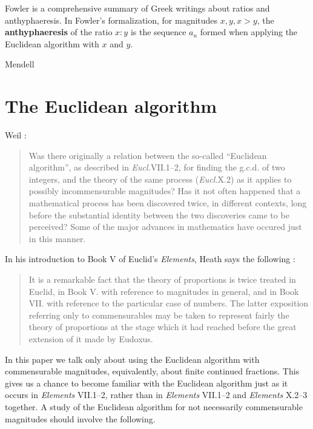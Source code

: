 \documentclass{article}
\begin{document}
Fowler \cite{fowler} is a comprehensive summary of Greek writings about ratios and anthyphaeresis. In Fowler's
formalization, for
magnitudes $x,y, x>y$, the \textbf{anthyphaeresis}
of the ratio $x:y$ is 
the sequence $a_n$ formed when applying the Euclidean algorithm with $x$ and $y$. 
 


Mendell \cite{mendell}





\section{The Euclidean algorithm}
Weil \cite[p.~5, Chap. I, \S II]{weil}:

\begin{quote}
Was there originally a relation between the so-called ``Euclidean algorithm'', as described in {\em Eucl.}VII.1--2, for finding
the g.c.d. of two integers, and the theory of the same process ({\em Eucl.}X.2) as it applies to
possibly incommensurable magnitudes? Has it not often happened that a mathematical process has been discovered twice,
in different contexts, long before the substantial identity between the two discoveries came to be perceived?
Some of the major advances in mathematics have occured just in this manner.
\end{quote}

In his introduction to Book V of Euclid's {\em Elements}, Heath says the following \cite[p.~113]{euclidII}:

\begin{quote}
It is a remarkable fact that the theory of proportions is twice treated in
Euclid, in Book V. with reference to magnitudes in general, and in Book VII.
with reference to the particular case of numbers. The latter exposition
referring only to commensurables may be taken to represent fairly the theory
of proportions at the stage which it had reached before the great extension of
it made by Eudoxus.
\end{quote}


In this paper we talk only about using the Euclidean algorithm with commensurable magnitudes, equivalently, about finite continued fractions. 
This gives us a chance to become familiar with the 
Euclidean algorithm just as it occurs in {\em Elements} VII.1--2, rather than in  {\em Elements} VII.1--2 and {\em Elements} X.2--3 together. 
A study of the Euclidean algorithm for not necessarily commensurable magnitudes should involve the following.
\end{document}

